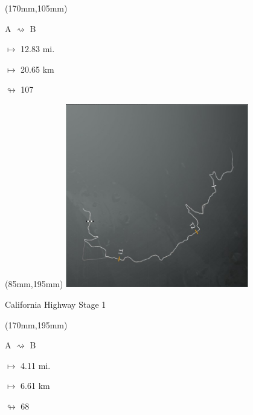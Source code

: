 \begin{textblock*}{30mm}(170mm,105mm)%
\par A $\rightsquigarrow$ B
\Large
\par$\mapsto$ 12.83 mi.
\par$\mapsto$ 20.65 km
\par$\looparrowright$ 107
\end{textblock*}
\begin{textblock*}{80mm}(85mm,195mm)%
\includegraphics[width=80mm]{TR/2015-05-20_00014.png}
\centerline{California Highway Stage 1}
\end{textblock*}
\begin{textblock*}{30mm}(170mm,195mm)%
\par A $\rightsquigarrow$ B
\Large
\par$\mapsto$ 4.11 mi.
\par$\mapsto$ 6.61 km
\par$\looparrowright$ 68
\end{textblock*}
\null\newpage

